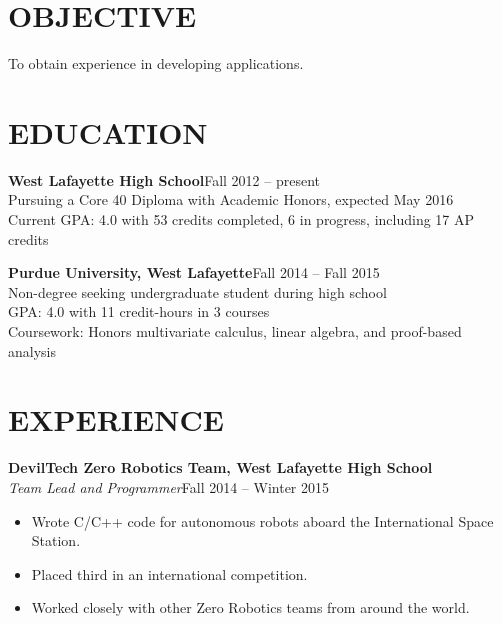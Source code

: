 \documentclass[line,margin]{res}
\begin{document}
\begin{resume}

  \section{OBJECTIVE}
  To obtain experience in developing applications.


  \section{EDUCATION}
  {\bf\rmfamily West Lafayette High School}\hfill Fall 2012 -- present\\
  Pursuing a Core 40 Diploma with Academic Honors, expected May 2016\\
  Current GPA: 4.0 with 53 credits completed, 6 in progress, including 17 AP credits

  {\bf\rmfamily Purdue University, West Lafayette}\hfill Fall 2014 -- Fall 2015\\
  Non-degree seeking undergraduate student during high school\\
  GPA: 4.0 with 11 credit-hours in 3 courses \\
  Coursework: Honors multivariate calculus, linear algebra, and proof-based analysis



  \section{EXPERIENCE}
  {\bf\rmfamily DevilTech Zero Robotics Team, West Lafayette High School}\\
  \emph{Team Lead and Programmer}\hfill Fall 2014 -- Winter 2015
  \begin{itemize}  \itemsep -2pt %
  \item Wrote C/C++ code for autonomous robots aboard the International Space Station.
  \item Placed third in an international competition.
  \item Worked closely with other Zero Robotics teams from around the world.
  \end{itemize}


\end{resume}
\end{document}
